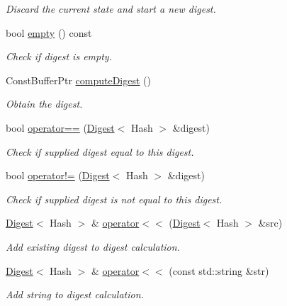 \begin{DoxyCompactItemize}
\begin{DoxyCompactList}\small\item\em Discard the current state and start a new digest. \end{DoxyCompactList}\item 
bool \hyperlink{classndn_1_1util_1_1Digest_aca5cc47adb72f06204b887283e5ec3ca}{empty} () const
\begin{DoxyCompactList}\small\item\em Check if digest is empty. \end{DoxyCompactList}\item 
Const\+Buffer\+Ptr \hyperlink{classndn_1_1util_1_1Digest_a1ea2b67f5821fd877eea58aa35e24263}{compute\+Digest} ()
\begin{DoxyCompactList}\small\item\em Obtain the digest. \end{DoxyCompactList}\item 
bool \hyperlink{classndn_1_1util_1_1Digest_a7457951b0ce7d56cf73fdfa419aaa0d9}{operator==} (\hyperlink{classndn_1_1util_1_1Digest}{Digest}$<$ Hash $>$ \&digest)
\begin{DoxyCompactList}\small\item\em Check if supplied digest equal to this digest. \end{DoxyCompactList}\item 
bool \hyperlink{classndn_1_1util_1_1Digest_af0bfdd780453813aa72b0b69314a4a80}{operator!=} (\hyperlink{classndn_1_1util_1_1Digest}{Digest}$<$ Hash $>$ \&digest)
\begin{DoxyCompactList}\small\item\em Check if supplied digest is not equal to this digest. \end{DoxyCompactList}\item 
\hyperlink{classndn_1_1util_1_1Digest}{Digest}$<$ Hash $>$ \& \hyperlink{classndn_1_1util_1_1Digest_a5e27d1e8a75d3e011018c695172c958e}{operator$<$$<$} (\hyperlink{classndn_1_1util_1_1Digest}{Digest}$<$ Hash $>$ \&src)
\begin{DoxyCompactList}\small\item\em Add existing digest to digest calculation. \end{DoxyCompactList}\item 
\hyperlink{classndn_1_1util_1_1Digest}{Digest}$<$ Hash $>$ \& \hyperlink{classndn_1_1util_1_1Digest_a8b73026f46f94360262a41357006149d}{operator$<$$<$} (const std\+::string \&str)
\begin{DoxyCompactList}\small\item\em Add string to digest calculation. \end{DoxyCompactList}\item 

\end{DoxyCompactItemize}
